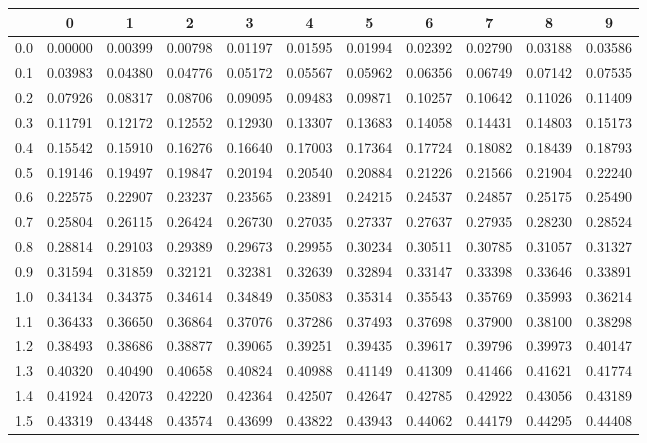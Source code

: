 \begin{table}[H]
\centering
\footnotesize
\begin{tabular}{r|ccccc|ccccc}
  \hline
 & 0 & 1 & 2 & 3 & 4 & 5 & 6 & 7 & 8 & 9 \\ 
  \hline
  0.0 & 0.00000 & 0.00399 & 0.00798 & 0.01197 & 0.01595 & 0.01994 & 0.02392 & 0.02790 & 0.03188 & 0.03586 \\ 
  0.1 & 0.03983 & 0.04380 & 0.04776 & 0.05172 & 0.05567 & 0.05962 & 0.06356 & 0.06749 & 0.07142 & 0.07535 \\ 
  0.2 & 0.07926 & 0.08317 & 0.08706 & 0.09095 & 0.09483 & 0.09871 & 0.10257 & 0.10642 & 0.11026 & 0.11409 \\ 
  0.3 & 0.11791 & 0.12172 & 0.12552 & 0.12930 & 0.13307 & 0.13683 & 0.14058 & 0.14431 & 0.14803 & 0.15173 \\ 
  0.4 & 0.15542 & 0.15910 & 0.16276 & 0.16640 & 0.17003 & 0.17364 & 0.17724 & 0.18082 & 0.18439 & 0.18793 \\ 
  0.5 & 0.19146 & 0.19497 & 0.19847 & 0.20194 & 0.20540 & 0.20884 & 0.21226 & 0.21566 & 0.21904 & 0.22240 \\ 
\hline
  0.6 & 0.22575 & 0.22907 & 0.23237 & 0.23565 & 0.23891 & 0.24215 & 0.24537 & 0.24857 & 0.25175 & 0.25490 \\ 
  0.7 & 0.25804 & 0.26115 & 0.26424 & 0.26730 & 0.27035 & 0.27337 & 0.27637 & 0.27935 & 0.28230 & 0.28524 \\ 
  0.8 & 0.28814 & 0.29103 & 0.29389 & 0.29673 & 0.29955 & 0.30234 & 0.30511 & 0.30785 & 0.31057 & 0.31327 \\ 
  0.9 & 0.31594 & 0.31859 & 0.32121 & 0.32381 & 0.32639 & 0.32894 & 0.33147 & 0.33398 & 0.33646 & 0.33891 \\ 
  1.0 & 0.34134 & 0.34375 & 0.34614 & 0.34849 & 0.35083 & 0.35314 & 0.35543 & 0.35769 & 0.35993 & 0.36214 \\ 
\hline
  1.1 & 0.36433 & 0.36650 & 0.36864 & 0.37076 & 0.37286 & 0.37493 & 0.37698 & 0.37900 & 0.38100 & 0.38298 \\ 
  1.2 & 0.38493 & 0.38686 & 0.38877 & 0.39065 & 0.39251 & 0.39435 & 0.39617 & 0.39796 & 0.39973 & 0.40147 \\ 
  1.3 & 0.40320 & 0.40490 & 0.40658 & 0.40824 & 0.40988 & 0.41149 & 0.41309 & 0.41466 & 0.41621 & 0.41774 \\ 
  1.4 & 0.41924 & 0.42073 & 0.42220 & 0.42364 & 0.42507 & 0.42647 & 0.42785 & 0.42922 & 0.43056 & 0.43189 \\ 
  1.5 & 0.43319 & 0.43448 & 0.43574 & 0.43699 & 0.43822 & 0.43943 & 0.44062 & 0.44179 & 0.44295 & 0.44408 \\ 

\end{tabular}
\end{table}
